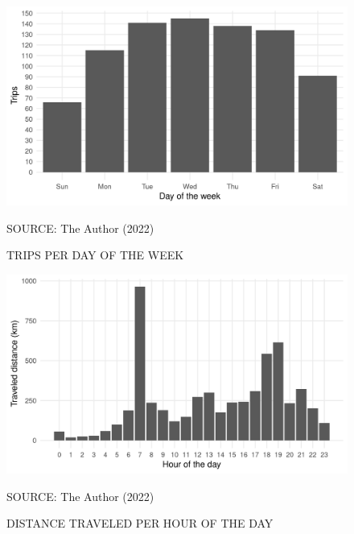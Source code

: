 
\begin{figure}[!htbp]
    \centering\footnotesize
    \captionsetup{font=footnotesize}
    \caption{TRIPS PER DAY OF THE WEEK}
    \includegraphics{fig/dotw_trips.png}
    \label{fig:dotw_trips}
    \par SOURCE: The Author (2022)
\end{figure}


\begin{figure}[!htbp]
    \centering\footnotesize
    \captionsetup{font=footnotesize}
    \caption{DISTANCE TRAVELED PER HOUR OF THE DAY}
    \includegraphics{fig/hotd_dist.png}
    \label{fig:hotd_dist}
    \par SOURCE: The Author (2022)
\end{figure}


